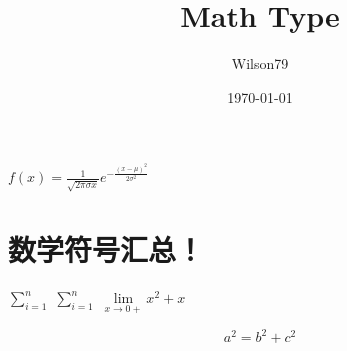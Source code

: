 \documentclass{article}
\title{Math Type}
\author{Wilson79}
\date{\today}
\begin{document}
 
    \tableofcontents %
    \maketitle %
    
    $f(x)=\frac{1}{\sqrt{2 \pi \sigma x}} e^{-\frac{(x-\mu)^{2}}{2 \sigma^{2}}}$

    \section{数学符号汇总！}
    $\sum _{i=1}^{n}$ %
    $\sum \limits_{i=1}^{n}$
    $\lim\limits _{x \rightarrow 0+} x^2 + x$ 


    {\color{blue} \[a^2 = b ^2 + c^2 \tag{*}\]} %
\end{document}
